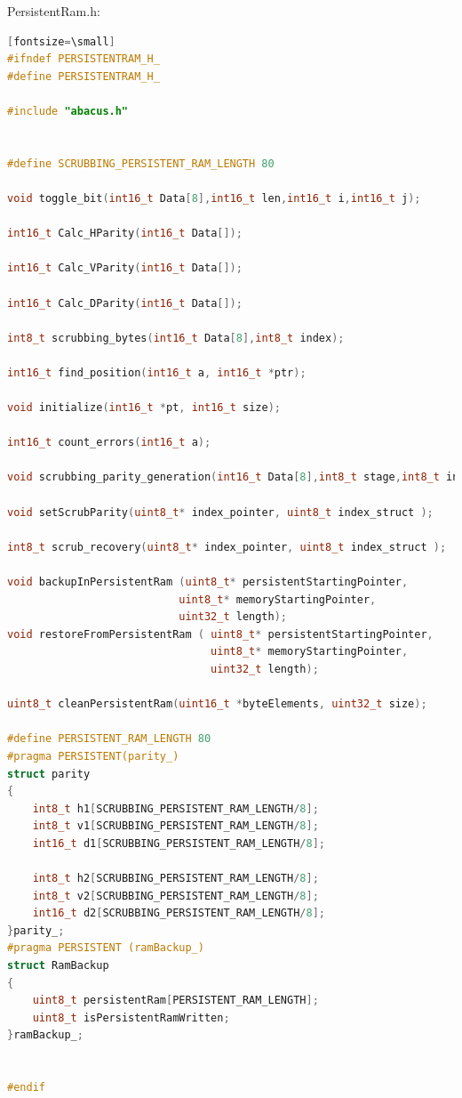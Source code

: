 \documentclass[LaM,binding=0.6cm]{../sapthesis}
\begin{document}
PersistentRam.h:
\begin{lstlisting}[language=c][fontsize=\small]
#ifndef PERSISTENTRAM_H_
#define PERSISTENTRAM_H_

#include "abacus.h"


#define SCRUBBING_PERSISTENT_RAM_LENGTH 80

void toggle_bit(int16_t Data[8],int16_t len,int16_t i,int16_t j);

int16_t Calc_HParity(int16_t Data[]);

int16_t Calc_VParity(int16_t Data[]);

int16_t Calc_DParity(int16_t Data[]);

int8_t scrubbing_bytes(int16_t Data[8],int8_t index);

int16_t find_position(int16_t a, int16_t *ptr);

void initialize(int16_t *pt, int16_t size);

int16_t count_errors(int16_t a);

void scrubbing_parity_generation(int16_t Data[8],int8_t stage,int8_t index );

void setScrubParity(uint8_t* index_pointer, uint8_t index_struct );

int8_t scrub_recovery(uint8_t* index_pointer, uint8_t index_struct );

void backupInPersistentRam (uint8_t* persistentStartingPointer,
                           uint8_t* memoryStartingPointer,
                           uint32_t length);
void restoreFromPersistentRam ( uint8_t* persistentStartingPointer,
                                uint8_t* memoryStartingPointer,
                                uint32_t length);

uint8_t cleanPersistentRam(uint16_t *byteElements, uint32_t size);

#define PERSISTENT_RAM_LENGTH 80
#pragma PERSISTENT(parity_)
struct parity
{
    int8_t h1[SCRUBBING_PERSISTENT_RAM_LENGTH/8];
    int8_t v1[SCRUBBING_PERSISTENT_RAM_LENGTH/8];
    int16_t d1[SCRUBBING_PERSISTENT_RAM_LENGTH/8];

    int8_t h2[SCRUBBING_PERSISTENT_RAM_LENGTH/8];
    int8_t v2[SCRUBBING_PERSISTENT_RAM_LENGTH/8];
    int16_t d2[SCRUBBING_PERSISTENT_RAM_LENGTH/8];
}parity_;
#pragma PERSISTENT (ramBackup_)
struct RamBackup
{
    uint8_t persistentRam[PERSISTENT_RAM_LENGTH];
    uint8_t isPersistentRamWritten;
}ramBackup_;


#endif


\end{lstlisting}
\end{document}
